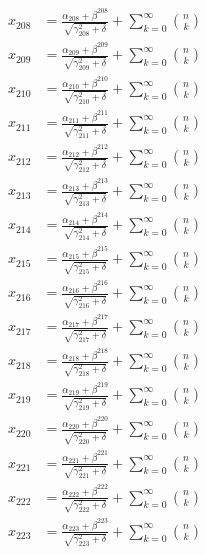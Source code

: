 \documentclass{article}
\begin{document}
\begin{align}
  x_{208} &= \frac{\alpha_{208} + \beta^{208}}{\sqrt{\gamma_{208}^2 + \delta}} + \sum_{k=0}^{\infty} \binom{n}{k} \label{eq:208} \\
  x_{209} &= \frac{\alpha_{209} + \beta^{209}}{\sqrt{\gamma_{209}^2 + \delta}} + \sum_{k=0}^{\infty} \binom{n}{k} \label{eq:209} \\
  x_{210} &= \frac{\alpha_{210} + \beta^{210}}{\sqrt{\gamma_{210}^2 + \delta}} + \sum_{k=0}^{\infty} \binom{n}{k} \label{eq:210} \\
  x_{211} &= \frac{\alpha_{211} + \beta^{211}}{\sqrt{\gamma_{211}^2 + \delta}} + \sum_{k=0}^{\infty} \binom{n}{k} \label{eq:211} \\
  x_{212} &= \frac{\alpha_{212} + \beta^{212}}{\sqrt{\gamma_{212}^2 + \delta}} + \sum_{k=0}^{\infty} \binom{n}{k} \label{eq:212} \\
  x_{213} &= \frac{\alpha_{213} + \beta^{213}}{\sqrt{\gamma_{213}^2 + \delta}} + \sum_{k=0}^{\infty} \binom{n}{k} \label{eq:213} \\
  x_{214} &= \frac{\alpha_{214} + \beta^{214}}{\sqrt{\gamma_{214}^2 + \delta}} + \sum_{k=0}^{\infty} \binom{n}{k} \label{eq:214} \\
  x_{215} &= \frac{\alpha_{215} + \beta^{215}}{\sqrt{\gamma_{215}^2 + \delta}} + \sum_{k=0}^{\infty} \binom{n}{k} \label{eq:215} \\
  x_{216} &= \frac{\alpha_{216} + \beta^{216}}{\sqrt{\gamma_{216}^2 + \delta}} + \sum_{k=0}^{\infty} \binom{n}{k} \label{eq:216} \\
  x_{217} &= \frac{\alpha_{217} + \beta^{217}}{\sqrt{\gamma_{217}^2 + \delta}} + \sum_{k=0}^{\infty} \binom{n}{k} \label{eq:217} \\
  x_{218} &= \frac{\alpha_{218} + \beta^{218}}{\sqrt{\gamma_{218}^2 + \delta}} + \sum_{k=0}^{\infty} \binom{n}{k} \label{eq:218} \\
  x_{219} &= \frac{\alpha_{219} + \beta^{219}}{\sqrt{\gamma_{219}^2 + \delta}} + \sum_{k=0}^{\infty} \binom{n}{k} \label{eq:219} \\
  x_{220} &= \frac{\alpha_{220} + \beta^{220}}{\sqrt{\gamma_{220}^2 + \delta}} + \sum_{k=0}^{\infty} \binom{n}{k} \label{eq:220} \\
  x_{221} &= \frac{\alpha_{221} + \beta^{221}}{\sqrt{\gamma_{221}^2 + \delta}} + \sum_{k=0}^{\infty} \binom{n}{k} \label{eq:221} \\
  x_{222} &= \frac{\alpha_{222} + \beta^{222}}{\sqrt{\gamma_{222}^2 + \delta}} + \sum_{k=0}^{\infty} \binom{n}{k} \label{eq:222} \\
  x_{223} &= \frac{\alpha_{223} + \beta^{223}}{\sqrt{\gamma_{223}^2 + \delta}} + \sum_{k=0}^{\infty} \binom{n}{k} \label{eq:223} \\

\end{align}
\end{document}
